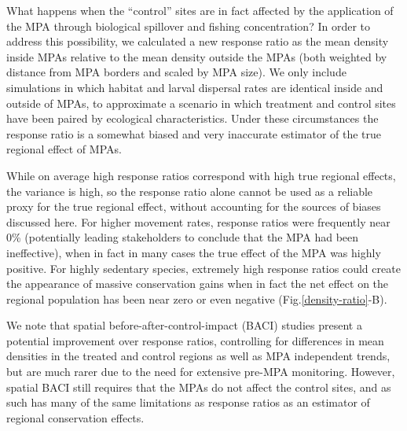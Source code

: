 \documentclass[9pt,twocolumn,twoside,lineno]{pnas-new}
\begin{document}
What happens when the ``control'' sites are in fact affected by the
application of the MPA through biological spillover and fishing
concentration? In order to address this possibility, we calculated a new
response ratio as the mean density inside MPAs relative to the mean
density outside the MPAs (both weighted by distance from MPA borders and
scaled by MPA size). We only include simulations in which habitat and
larval dispersal rates are identical inside and outside of MPAs, to
approximate a scenario in which treatment and control sites have been
paired by ecological characteristics. Under these circumstances the
response ratio is a somewhat biased and very inaccurate estimator of the
true regional effect of MPAs.

While on average high response ratios correspond with high true regional
effects, the variance is high, so the response ratio alone cannot be
used as a reliable proxy for the true regional effect, without
accounting for the sources of biases discussed here. For higher movement
rates, response ratios were frequently near 0\% (potentially leading
stakeholders to conclude that the MPA had been ineffective), when in
fact in many cases the true effect of the MPA was highly positive. For
highly sedentary species, extremely high response ratios could create
the appearance of massive conservation gains when in fact the net effect
on the regional population has been near zero or even negative
(Fig.\ref{density-ratio}-B).

We note that spatial before-after-control-impact (BACI) studies present
a potential improvement over response ratios, controlling for
differences in mean densities in the treated and control regions as well
as MPA independent trends, but are much rarer due to the need for
extensive pre-MPA monitoring. However, spatial BACI still requires that
the MPAs do not affect the control sites, and as such has many of the
same limitations as response ratios as an estimator of regional
conservation effects.
\end{document}
